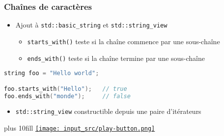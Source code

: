 \documentclass[C++.tex]{subfiles}
\begin{document}
\begin{frame}[fragile]
	\frametitle{Chaînes de caractères}
	\begin{itemize}
		\item Ajout à \lstinline|std::basic_string| et \lstinline|std::string_view|
		\begin{itemize}
			\item \lstinline|starts_with()| teste si la chaîne commence par une sous-chaîne
			\item \lstinline|ends_with()| teste si la chaîne termine par une sous-chaîne
		\end{itemize}
	\end{itemize}

	\begin{lstlisting}[language=C++]
string foo = "Hello world";

foo.starts_with("Hello");   // true
foo.ends_with("monde");     // false\end{lstlisting}

	\begin{itemize}
		\item \lstinline|std::string_view| constructible depuis une paire d'itérateurs
	\end{itemize}

	\vskip 10mm plus 10fill
	\hfill
	\href{https://godbolt.org/#g:!((g:!((g:!((h:codeEditor,i:(filename:'1',fontScale:14,fontUsePx:'0',j:1,lang:c%2B%2B,selection:(endColumn:1,endLineNumber:12,positionColumn:1,positionLineNumber:12,selectionStartColumn:1,selectionStartLineNumber:1,startColumn:1,startLineNumber:1),source:'%23include+%3Cstring%3E%0A%23include+%3Ciostream%3E%0A%0Aint+main()%0A%7B%0A++std::string+foo+%3D+%22Hello+world%22%3B%0A%0A++std::cout+%3C%3C+std::boolalpha%3B%0A++std::cout+%3C%3C+foo.starts_with(%22Hello%22)+%3C%3C+%22%5Cn%22%3B%0A++std::cout+%3C%3C+foo.ends_with(%22monde%22)+%3C%3C+%22%5Cn%22%3B%0A%7D%0A'),l:'5',n:'0',o:'C%2B%2B+source+%231',t:'0')),k:50,l:'4',n:'0',o:'',s:0,t:'0'),(g:!((h:executor,i:(argsPanelShown:'1',compilationPanelShown:'0',compiler:g122,compilerName:'',compilerOutShown:'0',execArgs:'',execStdin:'',fontScale:14,fontUsePx:'0',j:1,lang:c%2B%2B,libs:!((name:boost,ver:'175')),options:'-std%3Dc%2B%2B20+-Wall+-Wextra+-pedantic',source:1,stdinPanelShown:'1',tree:'1',wrap:'0'),l:'5',n:'0',o:'Executor+x86-64+gcc+12.2+(C%2B%2B,+Editor+%231)',t:'0')),header:(),k:50,l:'4',n:'0',o:'',s:0,t:'0')),l:'2',n:'0',o:'',t:'0')),version:4}{\texttt{[image: input\_src/play-button.png]}}
\end{frame}
\end{document}
